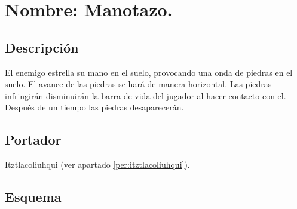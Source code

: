 \section{Nombre: Manotazo.} \label{hab.Manotazo}
\subsection{Descripción}
El enemigo estrella su mano en el suelo, provocando una onda de piedras en el suelo. El avance de las piedras se hará de manera horizontal. Las piedras infringirán disminuirán la barra de vida del jugador al hacer contacto con el. Después de un tiempo las piedras desaparecerán.
\subsection{Portador}
Itztlacoliuhqui (ver apartado \ref{per:itztlacoliuhqui}).
\subsection{Esquema}
			